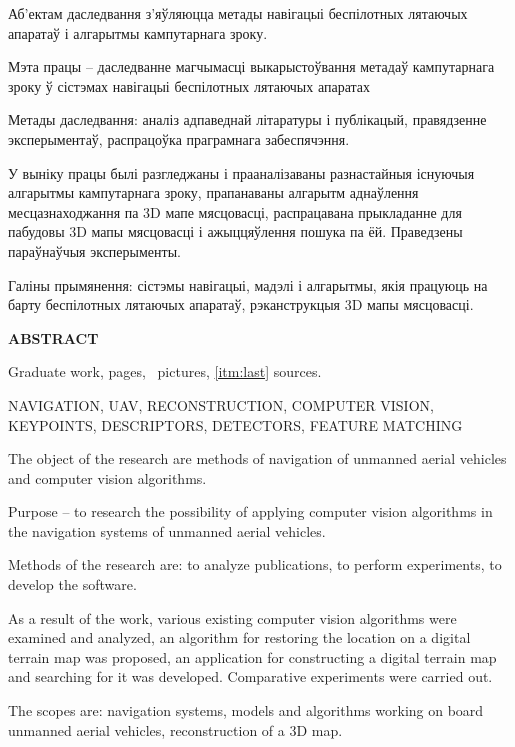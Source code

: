 Аб'ектам даследвання з'яўляюцца метады навігацыі беспілотных лятаючых апаратаў і алгарытмы кампутарнага зроку.

\vspace{1em}

Мэта працы -- даследванне магчымасці выкарыстоўвання метадаў кампутарнага зроку ў сістэмах навігацыі беспілотных лятаючых апаратах

\vspace{1em}

Метады даследвання: аналіз адпаведнай літаратуры і публікацый, правядзенне эксперыментаў, распрацоўка праграмнага забеспячэння.

\vspace{1em}

У выніку працы былі разгледжаны і прааналізаваны разнастайныя існуючыя алгарытмы кампутарнага зроку, прапанаваны алгарытм аднаўлення месцазнаходжання па 3D мапе мясцовасці, распрацавана прыкладанне для пабудовы 3D мапы мясцовасці і ажыццяўлення пошука па ёй. Праведзены параўнаўчыя эксперыменты.

\vspace{1em}


Галіны прымянення: сістэмы навігацыі, мадэлі і алгарытмы, якія працуюць на барту беспілотных лятаючых апаратаў, рэканструкцыя 3D мапы мясцовасці.
\newpage



\begin{center}
     \large\bfseries{ABSTRACT}
\end{center}

Graduate work, \pageref{LastPage} pages, \totalfigures\ pictures, \ref{itm:last} sources.

\begin{justify}
  \large{NAVIGATION, UAV, RECONSTRUCTION, COMPUTER VISION, KEYPOINTS, DESCRIPTORS, DETECTORS, FEATURE MATCHING}
\end{justify}

The object of the research are methods of navigation of unmanned aerial vehicles and computer vision algorithms.

\vspace{1em}


Purpose -- to research the possibility of applying computer vision algorithms in the navigation systems of unmanned aerial vehicles.

\vspace{1em}

Methods of the research are: to analyze publications, to perform experiments, to develop the software.

\vspace{1em}

As a result of the work, various existing computer vision algorithms were examined and analyzed, an algorithm for restoring the location on a digital terrain map was proposed, an application for constructing a digital terrain map and searching for it was developed. Comparative experiments were carried out.

\vspace{1em}


The scopes are: navigation systems, models and algorithms working on board unmanned aerial vehicles, reconstruction of a 3D map.
\newpage